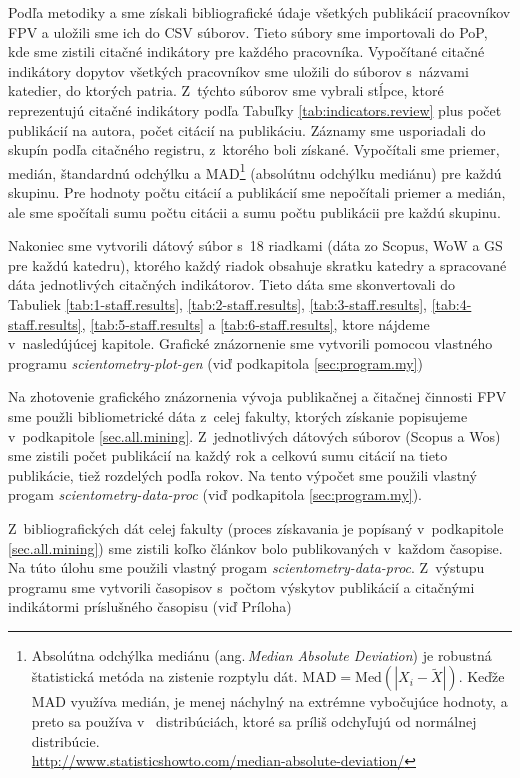 Podľa metodiky \citet{Kazakis2014a} a \citet{Kazakis2014b,Kazakis2015} sme
získali bibliografické údaje všetkých publikácií pracovníkov FPV a uložili sme
ich do CSV súborov. Tieto súbory sme importovali do PoP, kde sme zistili
citačné indikátory pre každého pracovníka. Vypočítané citačné indikátory
dopytov všetkých pracovníkov sme uložili do súborov s~názvami katedier, do
ktorých patria. Z~týchto súborov sme vybrali stĺpce, ktoré reprezentujú citačné
indikátory podľa Tabuľky \ref{tab:indicators.review} plus počet publikácií na
autora, počet citácií na publikáciu.  Záznamy sme usporiadali do skupín podľa
citačného registru, z~ktorého boli získané.  Vypočítali sme priemer, medián,
štandardnú odchýlku a MAD\footnote{Absolútna odchýlka mediánu (ang.\,\emph{Median
Absolute Deviation}) je robustná štatistická metóda na zistenie rozptylu dát.
$\mathrm{MAD} = \mathrm{Med}(|X_i - \tilde{X}|)$.  Keďže MAD využíva medián,
je menej náchylný na extrémne vybočujúce hodnoty, a preto sa používa v~
distribúciách, ktoré sa príliš odchyľujú od normálnej
distribúcie.\\\url{http://www.statisticshowto.com/median-absolute-deviation/}}
(absolútnu odchýlku mediánu) pre každú skupinu. Pre hodnoty počtu citácií a
publikácií sme nepočítali priemer a medián, ale sme spočítali sumu počtu citácii
a sumu počtu publikácii pre každú skupinu.

Nakoniec sme vytvorili dátový súbor s~18 riadkami (dáta zo Scopus, WoW a GS pre
každú katedru), ktorého každý riadok obsahuje skratku katedry a spracované dáta
jednotlivých citačných indikátorov.  Tieto dáta sme skonvertovali do Tabuliek
\ref{tab:1-staff.results}, \ref{tab:2-staff.results},
\ref{tab:3-staff.results}, \ref{tab:4-staff.results}, \ref{tab:5-staff.results}
a \ref{tab:6-staff.results}, ktore nájdeme v~nasledújúcej kapitole. Grafické
znázornenie sme vytvorili pomocou vlastného programu
\emph{scientometry-plot-gen} (viď podkapitola \ref{sec:program.my})

Na zhotovenie grafického znázornenia vývoja publikačnej a čitačnej činnosti FPV
sme použli bibliometrické dáta z~celej fakulty, ktorých získanie popisujeme
v~podkapitole \ref{sec.all.mining}. Z~jednotlivých dátových súborov (Scopus a
Wos) sme zistili počet publikácií na každý rok  a celkovú sumu citácií na tieto
publikácie, tiež rozdelých podľa rokov. Na tento výpočet sme použili vlastný
progam \emph{scientometry-data-proc} (viď podkapitola \ref{sec:program.my}).

Z~bibliografických dát celej fakulty (proces získavania je popísaný
v~podkapitole \ref{sec.all.mining}) sme zistili koľko článkov bolo
publikovaných v~každom časopise.  Na túto úlohu sme použili vlastný progam
\emph{scientometry-data-proc}. Z~výstupu programu sme vytvorili časopisov
s~počtom výskytov publikácií a citačnými indikátormi príslušného časopisu (viď
Príloha)

